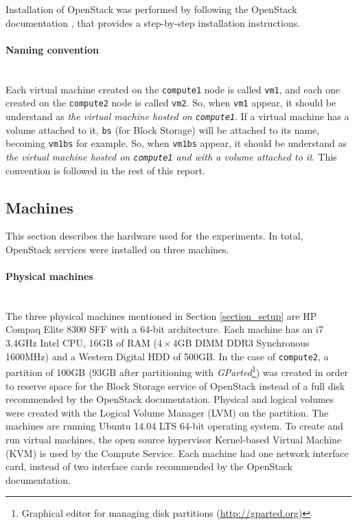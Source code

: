 Installation of OpenStack was performed by following the OpenStack documentation \cite{osinstall}, that provides a step-by-step installation instructions.


\paragraph{Naming convention}\mbox{}\\
Each virtual machine created on the \texttt{compute1} node is called \texttt{vm1}, and each one created on the \texttt{compute2} node is called \texttt{vm2}. 
So, when \texttt{vm1} appear, it should be understand as \textit{the virtual machine hosted on \texttt{compute1}}.
If a virtual machine has a volume attached to it, \texttt{bs} (for Block Storage) will be attached to its name, becoming \texttt{vm1bs} for example. 
So, when \texttt{vm1bs} appear, it should be understand as \textit{the virtual machine hosted on \texttt{compute1} and with a volume attached to it}.
This convention is followed in the rest of this report.


\subsection{Machines}
This section describes the hardware used for the experiments.
In total, OpenStack services were installed on three machines.


\paragraph{Physical machines}\mbox{}\\
The three physical machines mentioned in Section \ref{section_setup} are HP Compaq Elite 8300 SFF with a 64-bit architecture. 
Each machine has an i7 3.4GHz Intel CPU, 16GB of RAM ($4\times4$GB DIMM DDR3 Synchronous 1600MHz) and a Western Digital HDD of 500GB. 
In the case of \texttt{compute2}, a partition of 100GB (93GB after partitioning with \textit{GParted}\footnote{Graphical editor for managing disk partitions (\url{http://gparted.org})}) was created in order to reserve space for the Block Storage service of OpenStack instead of a full disk recommended by the OpenStack documentation. 
Physical and logical volumes were created with the Logical Volume Manager (LVM) on the partition.
The machines are running Ubuntu 14.04 LTS 64-bit operating system. 
To create and run virtual machines, the open source hypervisor Kernel-based Virtual Machine (KVM) is used by the Compute Service. Each machine had one network interface card, instead of two interface cards recommended by the OpenStack documentation.


